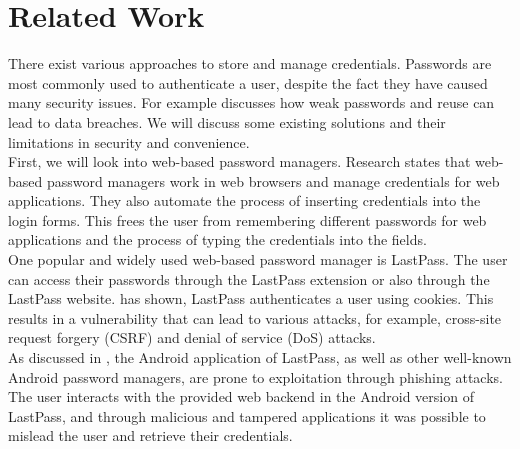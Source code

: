 \section{Related Work} \label{relwork}

There exist various approaches to store and manage credentials. Passwords are most commonly used to authenticate a user, despite the fact they have caused many security issues. For example \cite{WeakPasswords} discusses how weak passwords and reuse can lead to data breaches. We will discuss some existing solutions and their limitations in security and convenience. \\

First, we will look into web-based password managers. Research \cite{LiHAS14} states that web-based password managers work in web browsers and manage credentials for web applications. They also automate the process of inserting credentials into the login forms. This frees the user from remembering different passwords for web applications and the process of typing the credentials into the fields. \\
One popular and widely used web-based password manager is LastPass. The user can access their passwords through the LastPass extension or also through the LastPass website. \cite{LiHAS14} has shown, LastPass authenticates a user using cookies. This results in a vulnerability that can lead to various attacks, for example, cross-site request forgery (CSRF) and denial of service (DoS) attacks. \\
As discussed in \cite{AndroidPhishing}, the Android application of LastPass, as well as other well-known Android password managers, are prone to exploitation through phishing attacks. The user interacts with the provided web backend in the Android version of LastPass, and through malicious and tampered applications it was possible to mislead the user and retrieve their credentials. \\

